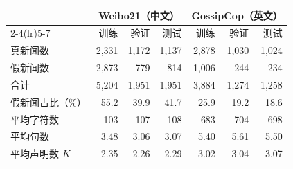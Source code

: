 \begin{tabular}{lrrrrrr}
\toprule
 & \multicolumn{3}{c}{Weibo21（中文）} & \multicolumn{3}{c}{GossipCop（英文）} \\
\cmidrule(lr){2-4}\cmidrule(lr){5-7}
 & 训练 & 验证 & 测试 & 训练 & 验证 & 测试 \\
\midrule
真新闻数 & 2,331 & 1,172 & 1,137 & 2,878 & 1,030 & 1,024 \\
假新闻数 & 2,873 & 779 & 814 & 1,006 & 244 & 234 \\
合计 & 5,204 & 1,951 & 1,951 & 3,884 & 1,274 & 1,258 \\
假新闻占比（\%） & 55.2 & 39.9 & 41.7 & 25.9 & 19.2 & 18.6 \\
平均字符数 & 103 & 107 & 108 & 683 & 704 & 698 \\
平均句数 & 3.48 & 3.06 & 3.07 & 5.40 & 5.61 & 5.50 \\
平均声明数 $K$ & 2.35 & 2.26 & 2.29 & 3.02 & 3.04 & 3.07 \\
\bottomrule
\end{tabular}
